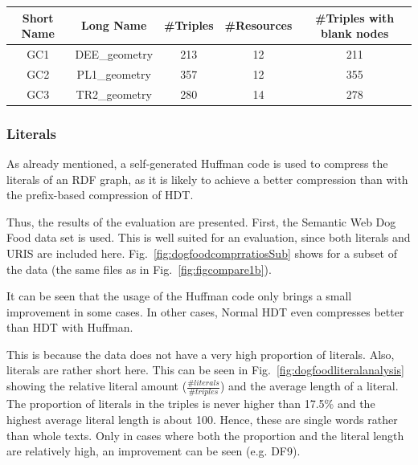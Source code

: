 \begin{center}
	\begin{tabular}{|c|c|c|c|c|}
		\hline 
		Short Name & Long Name & \#Triples & \#Resources & \#Triples with blank nodes \\ 
		\hline
		GC1 & DEE\_geometry & 213 & 12 & 211 \\
		\hline
		GC2 & PL1\_geometry & 357 & 12 & 355 \\
		\hline
		GC3 & TR2\_geometry & 280 & 14 & 278 \\
		\hline
	\end{tabular} 
	\label{tab:BlankImproveDatasets}
\end{center}


\clearpage
\subsubsection{Literals}\label{sec:evaluationLiterals}

As already mentioned, a self-generated Huffman code is used to compress the literals of an RDF graph, as it is likely to achieve a better compression than with the prefix-based compression of HDT.

Thus, the results of the evaluation are presented. First, the Semantic Web Dog Food data set is used. This is well suited for an evaluation, since both literals and URIS are included here. Fig.~\ref{fig:dogfoodcomprratiosSub} shows  for a subset of the data (the same files as in Fig.~\ref{fig:figcompare1b}).

It can be seen that the usage of the Huffman code only brings a small improvement in some cases. In other cases, Normal HDT even compresses better than HDT with Huffman.

This is because the data does not have a very high proportion of literals. Also, literals are rather short here. This can be seen in Fig.~\ref{fig:dogfoodliteralanalysis} showing the relative literal amount ($\frac{\#literals}{\#triples}$) and the average length of a literal. The proportion of literals in the triples is never higher than 17.5\% and the highest average literal length is about 100. Hence, these are single words rather than whole texts. Only in cases where both the proportion and the literal length are relatively high, an improvement can be seen (e.g. DF9).


